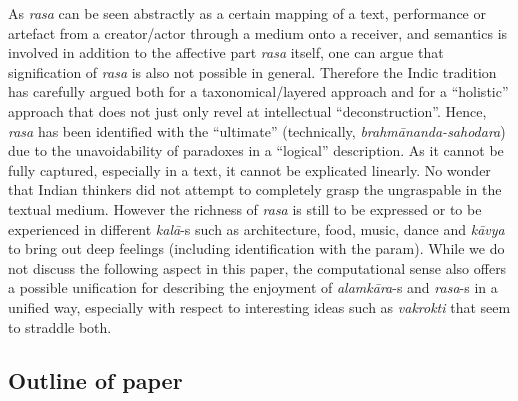As \textsl{rasa} can be seen abstractly as a certain mapping of a text, performance or artefact from a creator/actor through a medium onto a receiver, and semantics is involved in addition to the affective part \textsl{rasa} itself, one can argue that signification of \textsl{rasa} is also not possible in general. Therefore the Indic tradition has carefully argued both for a taxonomical/layered approach and for a “holistic” approach that does not just only revel at intellectual “deconstruction”. Hence, \textsl{rasa} has been identified with the “ultimate” (technically, \textsl{brahmānanda-sahodara}) due to the unavoidability of paradoxes in a “logical” description. As it cannot be fully captured, especially in a text, it cannot be explicated linearly. No wonder that Indian thinkers did not attempt to completely grasp the ungraspable in the textual medium. However the richness of \textsl{rasa} is still to be expressed or to be experienced in different \textsl{kalā}-s such as architecture, food, music, dance and \textsl{kāvya} to bring out deep feelings (including identification with the param). While we do not discuss the following aspect in this paper, the computational sense also offers a possible unification for describing the enjoyment of \textsl{alamkāra}-s and \textsl{rasa}-s in a unified way, especially with respect to interesting ideas such as \textsl{vakrokti} that seem to straddle both.

\subsection{Outline of paper}\label{chap3-sec1.2}

